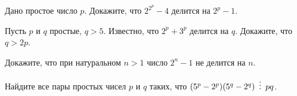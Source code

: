 \documentclass{article}
\begin{document}
\begin{enumerate_boxed}
        \item Дано простое число $ p $.
        Докажите, что $2^{2^p} - 4$ делится на $2^p - 1$.

        \item Пусть $ p $ и $ q $ простые, $ q > 5 $.
        Известно, что $ 2^p +3^p $ делится на $ q $.
        Докажите, что $ q > 2p $.

        \item Докажите, что при натуральном $ n > 1 $ число $ 2^n - 1 $ не делится на $ n $.

        \item Найдите все пары простых чисел $ p $ и $ q $ таких, что $ (5^p - 2^p)(5^q - 2^q) \,\,\,\vdots\,\,\, pq $.

    \end{enumerate_boxed}
\end{document}
